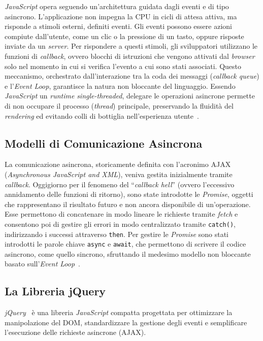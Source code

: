 \textit{JavaScript} opera seguendo un'architettura guidata dagli eventi e di tipo asincrono. L’applicazione non impegna la CPU in cicli di attesa attiva, ma risponde a stimoli esterni, definiti eventi. Gli eventi possono essere azioni compiute dall'utente, come un clic o la pressione di un tasto, oppure risposte inviate da un \textit{server}. Per rispondere a questi stimoli, gli sviluppatori utilizzano le funzioni di \textit{callback}, ovvero blocchi di istruzioni che vengono attivati dal \textit{browser} solo nel momento in cui si verifica l'evento a cui sono stati associati. Questo meccanismo, orchestrato dall'interazione tra la coda dei messaggi (\textit{callback queue}) e l’\textit{Event Loop}, garantisce la natura non bloccante del linguaggio. Essendo \textit{JavaScript} un \textit{runtime} \textit{single-threaded}, delegare le operazioni asincrone permette di non occupare il processo (\textit{thread}) principale, preservando la fluidità del \textit{rendering} ed evitando colli di bottiglia nell'esperienza utente~\autocite{flanaganJavaScriptDefinitiveGuide2020}.

\subsection*{Modelli di Comunicazione Asincrona}
La comunicazione asincrona, storicamente definita con l'acronimo AJAX (\textit{Asynchronous JavaScript and XML}), veniva gestita inizialmente tramite \textit{callback}. Oggigiorno per il fenomeno del ``\textit{callback hell}'' (ovvero l'eccessivo annidamento delle funzioni di ritorno), sono state introdotte le \textit{Promise}, oggetti che rappresentano il risultato futuro e non ancora disponibile di un'operazione. Esse permettono di concatenare in modo lineare le richieste tramite \textit{fetch} e consentono poi di gestire gli errori in modo centralizzato tramite \texttt{catch()}, indirizzando i successi attraverso \texttt{then}.  
Per gestire le \textit{Promise} sono stati introdotti le parole chiave \texttt{async} e \texttt{await}, che permettono di scrivere il codice asincrono, come quello sincrono, sfruttando il medesimo modello non bloccante basato sull'\textit{Event Loop}~\autocite[ch. 13]{flanaganJavaScriptDefinitiveGuide2020}.

\subsection*{La Libreria jQuery}
\textit{jQuery}~\autocite{openjsf.orgJQueryAPIDocumentation} è una libreria \textit{JavaScript} compatta progettata per ottimizzare la manipolazione del DOM, standardizzare la gestione degli eventi e semplificare l'esecuzione delle richieste asincrone (AJAX).

